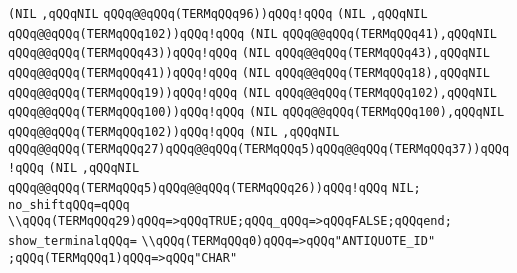 \verb|(NIL|\newline
\verb|,qQQqNIL|\newline
\verb|qQQq@@qQQq(TERMqQQq96))qQQq!qQQq|\newline
\verb|(NIL|\newline
\verb|,qQQqNIL|\newline
\verb|qQQq@@qQQq(TERMqQQq102))qQQq!qQQq|\newline
\verb|(NIL|\newline
\verb|qQQq@@qQQq(TERMqQQq41),qQQqNIL|\newline
\verb|qQQq@@qQQq(TERMqQQq43))qQQq!qQQq|\newline
\verb|(NIL|\newline
\verb|qQQq@@qQQq(TERMqQQq43),qQQqNIL|\newline
\verb|qQQq@@qQQq(TERMqQQq41))qQQq!qQQq|\newline
\verb|(NIL|\newline
\verb|qQQq@@qQQq(TERMqQQq18),qQQqNIL|\newline
\verb|qQQq@@qQQq(TERMqQQq19))qQQq!qQQq|\newline
\verb|(NIL|\newline
\verb|qQQq@@qQQq(TERMqQQq102),qQQqNIL|\newline
\verb|qQQq@@qQQq(TERMqQQq100))qQQq!qQQq|\newline
\verb|(NIL|\newline
\verb|qQQq@@qQQq(TERMqQQq100),qQQqNIL|\newline
\verb|qQQq@@qQQq(TERMqQQq102))qQQq!qQQq|\newline
\verb|(NIL|\newline
\verb|,qQQqNIL|\newline
\verb|qQQq@@qQQq(TERMqQQq27)qQQq@@qQQq(TERMqQQq5)qQQq@@qQQq(TERMqQQq37))qQQq!qQQq|\newline
\verb|(NIL|\newline
\verb|,qQQqNIL|\newline
\verb|qQQq@@qQQq(TERMqQQq5)qQQq@@qQQq(TERMqQQq26))qQQq!qQQq|\newline
\verb|NIL;|\newline
\verb|no_shiftqQQq=qQQq|\newline
\verb|\\qQQq(TERMqQQq29)qQQq=>qQQqTRUE;qQQq_qQQq=>qQQqFALSE;qQQqend;|\newline
\verb|show_terminalqQQq=|\newline
\verb|\\qQQq(TERMqQQq0)qQQq=>qQQq"ANTIQUOTE_ID"|\newline
\verb|;qQQq(TERMqQQq1)qQQq=>qQQq"CHAR"|\newline
